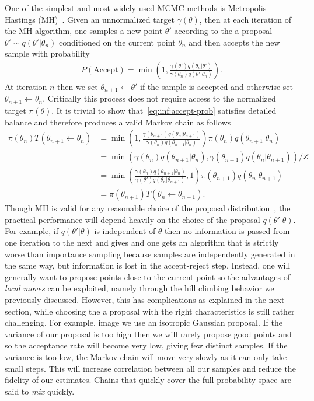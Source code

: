 One of the simplest and most widely used MCMC methods is Metropolis Hastings (MH)~\cite{hastings1970monte}.
Given an unnormalized target $\gamma(\theta)$, then at each iteration of the MH algorithm, one samples 
a new point $\theta'$ according to the a proposal $\theta' \sim q(\theta' | \theta_n)$ conditioned on the current point $\theta_n$ 
and then accepts the new sample with probability
\begin{align}
\label{eq:inf:accept-prob}
P(\text{Accept}) = \min \left(1, \frac{\gamma(\theta') q(\theta_n | \theta')}{\gamma(\theta_n) q(\theta' | \theta_n)}\right).
\end{align}
At iteration $n$ then we set $\theta_{n+1} \leftarrow \theta'$ if the sample is accepted and otherwise
set $\theta_{n+1} \leftarrow \theta_{n}$.  Critically this process does not require access to the normalized
target $\pi(\theta)$.  It is trivial to show that~\eqref{eq:inf:accept-prob} satisfies detailed
balance and therefore produces a valid Markov chain as follows
\begin{align*}
\pi(\theta_n) T(\theta_{n+1} \leftarrow \theta_n) &= \min \left(1, \frac{\gamma(\theta_{n+1}) q(\theta_n | \theta_{n+1})}{\gamma(\theta_n) q(\theta_{n+1} | \theta_n)}\right)
\pi(\theta_n) q(\theta_{n+1} | \theta_n) \\
&= \min \left(\gamma(\theta_n) q(\theta_{n+1} | \theta_n),\gamma(\theta_{n+1}) q(\theta_n | \theta_{n+1})\right) / Z \\
&= \min \left(\frac{\gamma(\theta_n) q(\theta_{n+1} | \theta_n)}{\gamma(\theta') q(\theta_n | \theta_{n+1})},1\right) \pi(\theta_{n+1}) q(\theta_n | \theta_{n+1}) \\
&=\pi(\theta_{n+1}) T(\theta_n \leftarrow \theta_{n+1}).
\end{align*}
Though MH is valid for any reasonable choice of the proposal distribution~\citep{tierney1994markov},
the practical performance will depend heavily on the choice of the proposal $q(\theta'|\theta)$.
For example, if $q(\theta'|\theta)$ is independent of $\theta$ then no information is passed from one iteration
to the next and gives and one gets an algorithm that is strictly worse than importance sampling
because samples are independently generated in the same way, but information is lost in the accept-reject
step.  Instead, one will generally want to propose points close to the current point so the advantages
of \emph{local moves} can be exploited, namely through the hill climbing behavior we previously discussed.  
However, this has complications as explained in the next
section, while choosing the a proposal with the right characteristics is still rather challenging.
For example, image we use an isotropic Gaussian proposal.  If the variance of our proposal 
is too high then we will rarely propose good points
and so the acceptance rate will become very low, giving few distinct samples.  If the variance is too low,
the Markov chain will move very slowly as it can only take small steps.  This will increase correlation
between all our samples and reduce the fidelity of our estimates.  Chains that quickly cover the full
probability space are said to \emph{mix} quickly.

